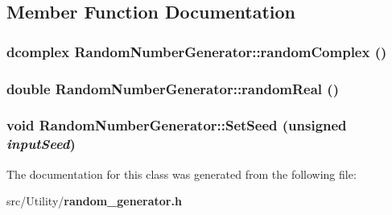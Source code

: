 \subsection{Member Function Documentation}
\subsubsection{\setlength{\rightskip}{0pt plus 5cm}\bf{dcomplex} Random\-Number\-Generator::random\-Complex ()\hspace{0.3cm}{\tt  [inline]}}\label{classRandomNumberGenerator_727112cf658a40c442abaab6f3543b85}


\subsubsection{\setlength{\rightskip}{0pt plus 5cm}double Random\-Number\-Generator::random\-Real ()\hspace{0.3cm}{\tt  [inline]}}\label{classRandomNumberGenerator_2cf46b64c1a1c8c62f4ac3720df43ffc}


\subsubsection{\setlength{\rightskip}{0pt plus 5cm}void Random\-Number\-Generator::Set\-Seed (unsigned {\em input\-Seed})\hspace{0.3cm}{\tt  [inline]}}\label{classRandomNumberGenerator_dc815a543e3b3a78b23a87a7f3d9a4ab}




The documentation for this class was generated from the following file:\begin{CompactItemize}
\item 
src/Utility/\bf{random\_\-generator.h}\end{CompactItemize}
